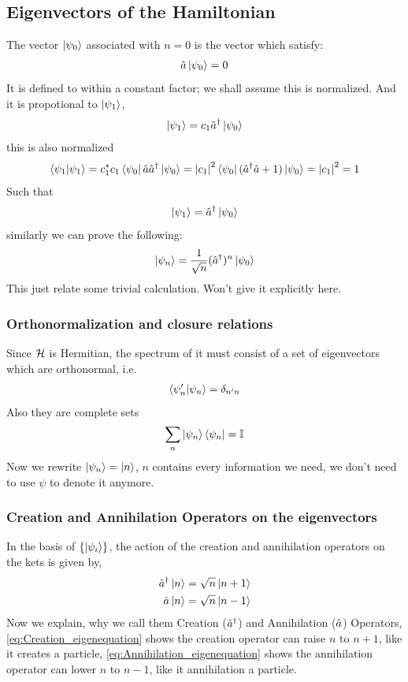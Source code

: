 \subsection{Eigenvectors of the Hamiltonian}
The vector $\ket{\psi_0}$ associated with $n=0$ is the vector which satisfy:
\begin{eqnarray}
    \hat{a} \ket{\psi_0} = 0
\end{eqnarray}
It is defined to within a constant factor; we shall assume this is normalized. And it is propotional to $\ket{\psi_1}$,
\begin{eqnarray}
    \ket{\psi_1} = c_1 \hat{a}^ \dag \ket{\psi_0}
\end{eqnarray}
this is also normalized
\begin{eqnarray}
    \braket{\psi_1|\psi_1} = c_1^* c_1 \bra{\psi_0} \hat{a} \hat{a}^ \dag \ket{\psi_0} = \left| c_1 \right|^2 \bra{\psi_0} (\hat{a}^ \dag \hat{a} + 1) \ket{\psi_0} = \left| c_1 \right|^2 =1 
\end{eqnarray}
Such that 
\begin{eqnarray}
    \ket{\psi_1} = \hat{a}^ \dag \ket{\psi_0}
\end{eqnarray}
similarly we can prove the following: 
\begin{eqnarray}
    \ket{\psi_n} = \frac{1}{\sqrt{n}} (\hat{a}^ \dag)^n \ket{\psi_0} 
\end{eqnarray}
This just relate some trivial calculation. Won't give it explicitly here.
\subsubsection{Orthonormalization and closure relations}
Since $\mathcal{H}$ is Hermitian, the spectrum of it must consist of a set of eigenvectors which are orthonormal, i.e.
\begin{eqnarray}
    \braket{\psi'_n|\psi_n} = \delta_{n'n}
\end{eqnarray}
Also they are complete sets 
\begin{eqnarray}
    \sum_n \ket{\psi_n} \bra{\psi_n} = \mathbb{I}
\end{eqnarray}
Now we rewrite $\ket{\psi_n} = \ket{n}$, $n$ contains every information we need, we don't need to use $\psi$ to denote it anymore.

\subsubsection{Creation and Annihilation Operators on the eigenvectors}
In the basis of $\{\ket{\psi_i}\}$, the action of the creation and annihilation operators on the kets is given by, 
\begin{align}
    \hat{a}^ \dag \ket{n} = \sqrt{n} \ket{n+1} \label{eq:Creation_eigenequation} \\
    \hat{a} \ket{n} = \sqrt{n} \ket{n-1} \label{eq:Annihilation_eigenequation}
\end{align}
Now we explain, why we call them Creation ($\hat{a}^ \dag$) and Annihilation ($\hat{a}$) Operators, \cref{eq:Creation_eigenequation} shows the creation operator can raise $n$ to $n+1$, like it creates a particle, \cref{eq:Annihilation_eigenequation} shows the annihilation operator can lower $n$ to $n-1$, like it annihilation a particle. 

